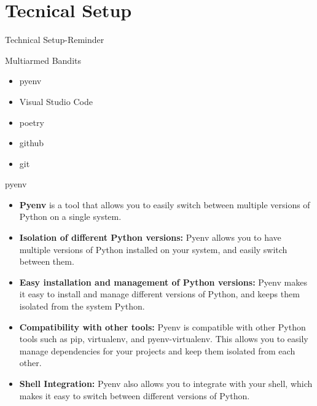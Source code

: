 \section{Tecnical Setup}

\begin{frame}{Technical Setup-Reminder}
    \begin{content}{Multiarmed Bandits}
        \begin{itemize}
            \item pyenv
            \item Visual Studio Code
            \item poetry
            \item github
            \item git
        \end{itemize}
    \end{content}
\end{frame}

\begin{frame}
    \begin{content}{pyenv}
        \begin{itemize}
            \item \textbf{Pyenv} is a tool that allows you to easily switch between multiple versions of Python on a single system.
            \item \textbf{Isolation of different Python versions:} Pyenv allows you to have multiple versions of Python installed on your system, and easily switch between them.
            \item \textbf{Easy installation and management of Python versions:} Pyenv makes it easy to install and manage different versions of Python, and keeps them isolated from the system Python.
            \item \textbf{Compatibility with other tools:} Pyenv is compatible with other Python tools such as pip, virtualenv, and pyenv-virtualenv. This allows you to easily manage dependencies for your projects and keep them isolated from each other.
            \item \textbf{Shell Integration:} Pyenv also allows you to integrate with your shell, which makes it easy to switch between different versions of Python.
        \end{itemize} 
    \end{content}
\end{frame}

